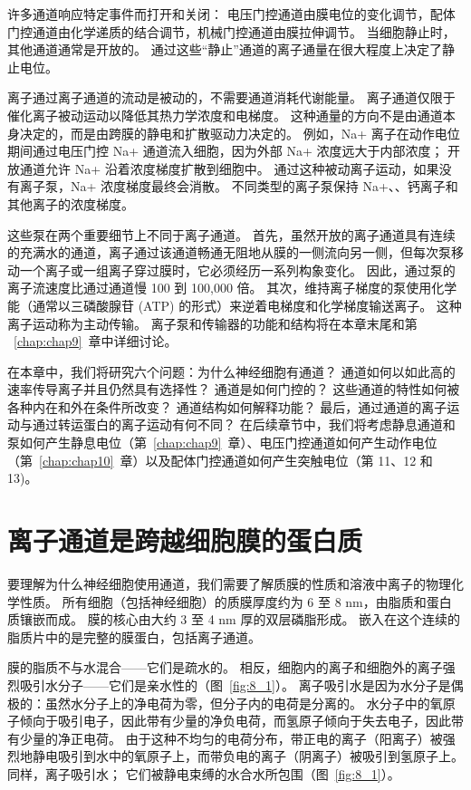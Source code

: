 许多通道响应特定事件而打开和关闭：
电压门控通道由膜电位的变化调节，配体门控通道由化学递质的结合调节，机械门控通道由膜拉伸调节。
当细胞静止时，其他通道通常是开放的。
通过这些“静止”通道的离子通量在很大程度上决定了静止电位。


离子通过离子通道的流动是被动的，不需要通道消耗代谢能量。
离子通道仅限于催化离子被动运动以降低其热力学浓度和电梯度。
这种通量的方向不是由通道本身决定的，而是由跨膜的静电和扩散驱动力决定的。
例如，Na+ 离子在动作电位期间通过电压门控 Na+ 通道流入细胞，因为外部 Na+ 浓度远大于内部浓度；
开放通道允许 Na+ 沿着浓度梯度扩散到细胞中。
通过这种被动离子运动，如果没有离子泵，Na+ 浓度梯度最终会消散。
不同类型的离子泵保持 Na+、、钙离子和其他离子的浓度梯度。


这些泵在两个重要细节上不同于离子通道。
首先，虽然开放的离子通道具有连续的充满水的通道，离子通过该通道畅通无阻地从膜的一侧流向另一侧，但每次泵移动一个离子或一组离子穿过膜时，它必须经历一系列构象变化。
因此，通过泵的离子流速度比通过通道慢 100 到 100,000 倍。
其次，维持离子梯度的泵使用化学能（通常以三磷酸腺苷 (ATP) 的形式）来逆着电梯度和化学梯度输送离子。
这种离子运动称为主动传输。
离子泵和传输器的功能和结构将在本章末尾和第 ~\ref{chap:chap9}~章中详细讨论。


在本章中，我们将研究六个问题：为什么神经细胞有通道？
通道如何以如此高的速率传导离子并且仍然具有选择性？ 
通道是如何门控的？
这些通道的特性如何被各种内在和外在条件所改变？
通道结构如何解释功能？
最后，通过通道的离子运动与通过转运蛋白的离子运动有何不同？
在后续章节中，我们将考虑静息通道和泵如何产生静息电位（第~\ref{chap:chap9}~章）、电压门控通道如何产生动作电位（第~\ref{chap:chap10}~章）以及配体门控通道如何产生突触电位（第 11、12 和 13)。



\section{离子通道是跨越细胞膜的蛋白质}

要理解为什么神经细胞使用通道，我们需要了解质膜的性质和溶液中离子的物理化学性质。
所有细胞（包括神经细胞）的质膜厚度约为 6 至 8 nm，由脂质和蛋白质镶嵌而成。
膜的核心由大约 3 至 4 nm 厚的双层磷脂形成。
嵌入在这个连续的脂质片中的是完整的膜蛋白，包括离子通道。


膜的脂质不与水混合——它们是疏水的。
相反，细胞内的离子和细胞外的离子强烈吸引水分子——它们是亲水性的（图~\ref{fig:8_1}）。
离子吸引水是因为水分子是偶极的：虽然水分子上的净电荷为零，但分子内的电荷是分离的。
水分子中的氧原子倾向于吸引电子，因此带有少量的净负电荷，而氢原子倾向于失去电子，因此带有少量的净正电荷。
由于这种不均匀的电荷分布，带正电的离子（阳离子）被强烈地静电吸引到水中的氧原子上，而带负电的离子（阴离子）被吸引到氢原子上。
同样，离子吸引水； 它们被静电束缚的水合水所包围（图~\ref{fig:8_1}）。


